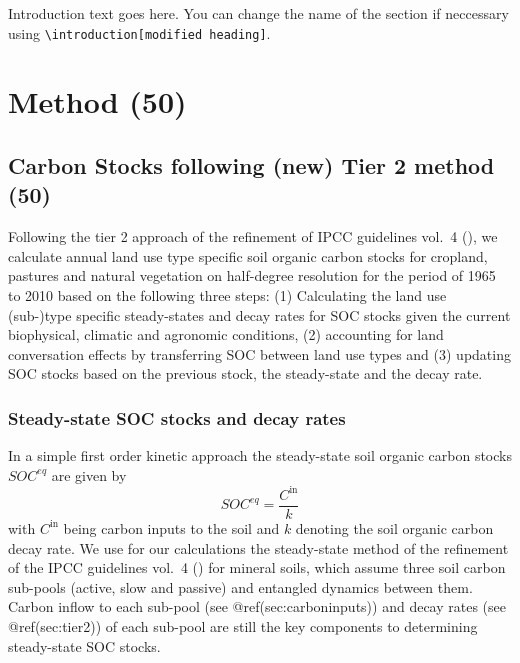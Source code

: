 \documentclass[gc, manuscript]{copernicus}
\begin{document}


\newpage

\introduction

Introduction text goes here. You can change the name of the section if
neccessary using
\texttt{\textbackslash{}introduction{[}modified\ heading{]}}. \newpage

\section{Method (50)}

\hypertarget{sec:carbonbudget}{%
\subsection{Carbon Stocks following (new) Tier 2 method
(50)}\label{sec:carbonbudget}}

Following the tier 2 approach of the refinement of IPCC guidelines
vol.~4 (\citet{ipcc_2019_2019}), we calculate annual land use type
specific soil organic carbon stocks for cropland, pastures and natural
vegetation on half-degree resolution for the period of 1965 to 2010
based on the following three steps: (1) Calculating the land use
(sub-)type specific steady-states and decay rates for SOC stocks given
the current biophysical, climatic and agronomic conditions, (2)
accounting for land conversation effects by transferring SOC between
land use types and (3) updating SOC stocks based on the previous stock,
the steady-state and the decay rate.

\subsubsection{Steady-state SOC stocks and decay rates}

In a simple first order kinetic approach the steady-state soil organic
carbon stocks \(SOC^{eq}\) are given by \begin{equation}
SOC^{eq} =\frac{C^{\textrm{in}}}{k}
\label{eq:inoutflow}
\end{equation} with \(C^{\textrm{in}}\) being carbon inputs to the soil
and \(k\) denoting the soil organic carbon decay rate. We use for our
calculations the steady-state method of the refinement of the IPCC
guidelines vol.~4 (\citet{ipcc_2019_2019}) for mineral soils, which
assume three soil carbon sub-pools (active, slow and passive) and
entangled dynamics between them. Carbon inflow to each sub-pool (see
@ref(sec:carboninputs)) and decay rates (see @ref(sec:tier2)) of each
sub-pool are still the key components to determining steady-state SOC
stocks.
\end{document}
